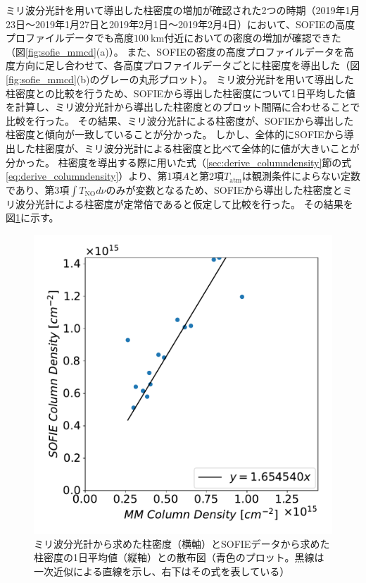 ミリ波分光計を用いて導出した柱密度の増加が確認された2つの時期（2019年1月23日〜2019年1月27日と2019年2月1日〜2019年2月4日）において、SOFIEの高度プロファイルデータでも高度$100\ \mathrm{km}$付近においての密度の増加が確認できた（図\ref{fig:sofie_mmcd}(a)）。
また、SOFIEの密度の高度プロファイルデータを高度方向に足し合わせて、各高度プロファイルデータごとに柱密度を導出した（図\ref{fig:sofie_mmcd}(b)のグレーの丸形プロット）。
ミリ波分光計を用いて導出した柱密度との比較を行うため、SOFIEから導出した柱密度について1日平均した値を計算し、ミリ波分光計から導出した柱密度とのプロット間隔に合わせることで比較を行った。
その結果、ミリ波分光計による柱密度が、SOFIEから導出した柱密度と傾向が一致していることが分かった。
しかし、全体的にSOFIEから導出した柱密度が、ミリ波分光計による柱密度と比べて全体的に値が大きいことが分かった。
柱密度を導出する際に用いた式（\ref{sec:derive_columndensity}節の式\eqref{eq:derive_columndensity}）より、第1項$A$と第2項$T_{\mathrm{atm}}$は観測条件によらない定数であり、第3項$\int T_{\mathrm{NO}}d\nu$のみが変数となるため、SOFIEから導出した柱密度とミリ波分光計による柱密度が定常倍であると仮定して比較を行った。
その結果を図\ref{fig:sofie_mmcd_sofiecd_corr}に示す。
\begin{figure}[htbp]
    \centering
    \includegraphics[scale=0.5]{master_thesis_contents/master_thesis_fig/sofie_mmcd_sofiecd_corr.pdf}
    \caption{ミリ波分光計から求めた柱密度（横軸）とSOFIEデータから求めた柱密度の1日平均値（縦軸）との散布図（青色のプロット。黒線は一次近似による直線を示し、右下はその式を表している）}
    \label{fig:sofie_mmcd_sofiecd_corr}
\end{figure}

